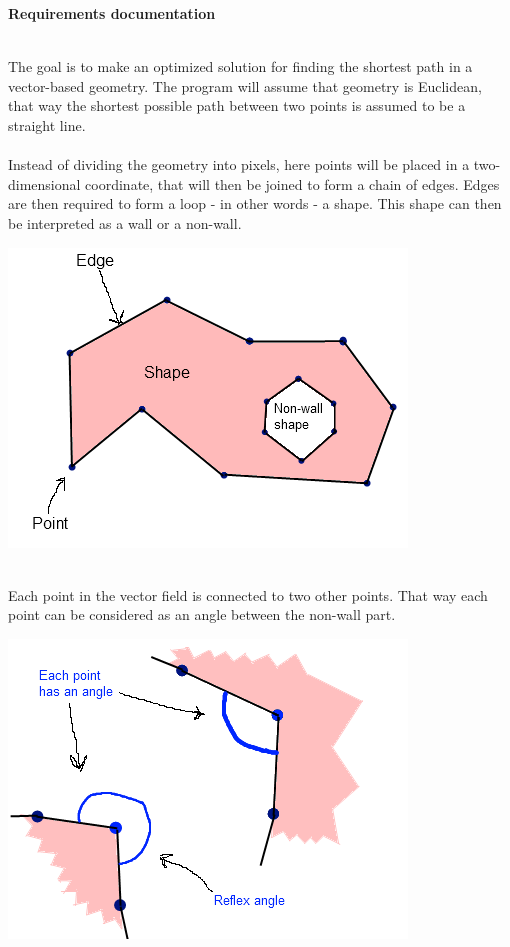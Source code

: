 \documentclass[a4paper,12pt]{article}
\begin{document}
\centerline{\huge \textbf{Requirements documentation}} \hspace*{\fill}
\\
The goal is to make an optimized solution for finding the shortest path in a vector-based geometry. The program will assume that geometry is Euclidean, that way the shortest possible path between two points is assumed to be a straight line.
\\
\\
Instead of dividing the geometry into pixels, here points will be placed in a two-dimensional
coordinate, that will then be joined to form a chain of edges. Edges are then required to form
a loop - in other words - a shape. This shape can then be interpreted as a wall or a non-wall.
\\
\centerline{\includegraphics[scale=0.5]{pointedgeshape.png}} \hspace*{\fill}
\\
Each point in the vector field is connected to two other points. That way each point can be considered as an angle between the non-wall part.
\\
\centerline{\includegraphics[scale=0.5]{pointsandangles.png}} \hspace*{\fill}
\end{document}
